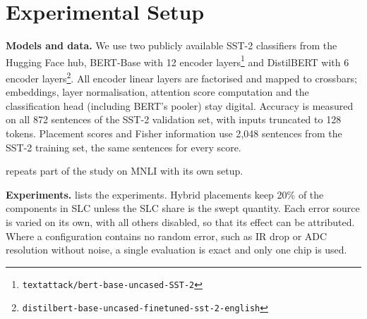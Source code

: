 \section{Experimental Setup}\label{sec:setup}

\textbf{Models and data.} We use two publicly available SST-2 classifiers from the Hugging Face hub,
BERT-Base with 12 encoder layers\footnote{\nolinkurl{textattack/bert-base-uncased-SST-2}} and DistilBERT
with 6 encoder layers\footnote{\nolinkurl{distilbert-base-uncased-finetuned-sst-2-english}}. All encoder
linear layers are factorised and mapped to crossbars; embeddings, layer normalisation, attention
score computation and the classification head (including BERT's pooler) stay digital. Accuracy is measured on all 872 sentences of the
SST-2 validation set, with inputs truncated to 128 tokens. Placement scores and Fisher information use
2{,}048 sentences from the SST-2 training set, the same sentences for every score.

 repeats part of the study on MNLI with its own setup.

\textbf{Experiments.}  lists the experiments. Hybrid placements keep 20\% of
the components in SLC unless the SLC share is the swept quantity. Each error source is varied on its own,
with all others disabled, so that its effect can be attributed. Where a configuration contains no random
error, such as IR drop or ADC resolution without noise, a single evaluation is exact and only one chip is
used.

